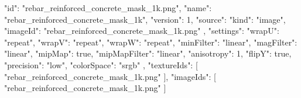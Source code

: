 {
  "id": "rebar_reinforced_concrete_mask_1k.png",
  "name": "rebar_reinforced_concrete_mask_1k",
  "version": 1,
  "source": {
    "kind": "image",
    "imageId": "rebar_reinforced_concrete_mask_1k.png"
  },
  "settings": {
    "wrapU": "repeat",
    "wrapV": "repeat",
    "wrapW": "repeat",
    "minFilter": "linear",
    "magFilter": "linear",
    "mipMap": true,
    "mipMapFilter": "linear",
    "anisotropy": 1,
    "flipY": true,
    "precision": "low",
    "colorSpace": "srgb"
  },
  "textureIds": [
    "rebar_reinforced_concrete_mask_1k.png"
  ],
  "imageIds": [
    "rebar_reinforced_concrete_mask_1k.png"
  ]
}
